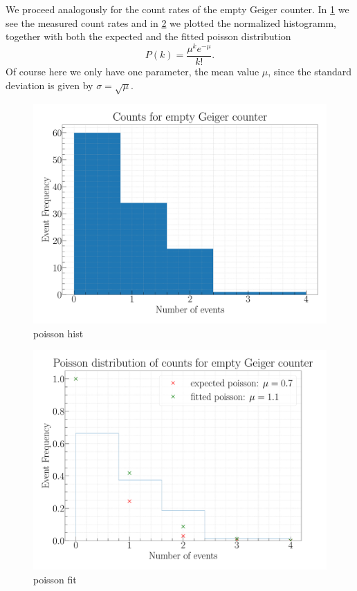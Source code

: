 We proceed analogously for the count rates of the empty Geiger counter. In \cref{fig:PoissonHist} we see the measured count rates and in \cref{fig:PoissonFit} we plotted the normalized histogramm, together with both the expected and the fitted poisson distribution
\begin{equation}
P(k) = \frac{\mu^k e^{-\mu}}{k!}.
\end{equation}
Of course here we only have one parameter, the mean value $\mu$, since the standard deviation is given by $\sigma = \sqrt{\mu}$.

\begin{figure}[H]
\centering
\includegraphics[width=\textwidth]{../Figures/Geiger_poisson_histogram.pdf}
\caption{poisson hist}
\label{fig:PoissonHist}
\end{figure}

\begin{figure}[H]
\centering
\includegraphics[width=\textwidth]{../Figures/Geiger_poisson_fit.pdf}
\caption{poisson fit}
\label{fig:PoissonFit}
\end{figure}

